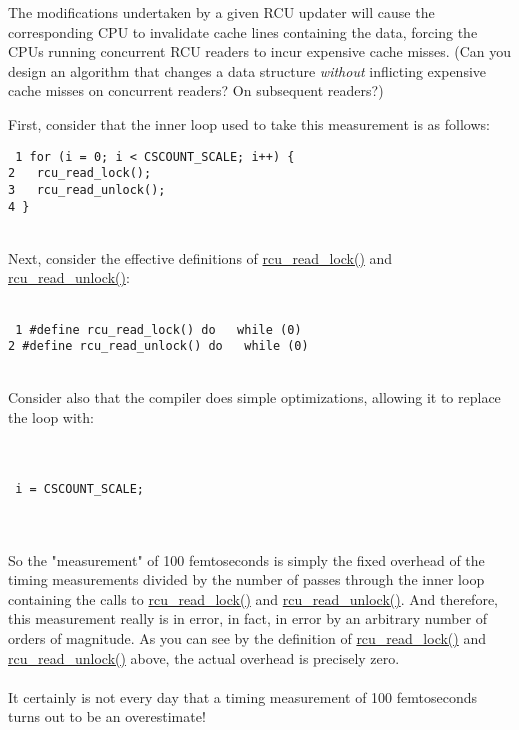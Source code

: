 The modifications undertaken by a given RCU updater will cause the
corresponding CPU to invalidate cache lines containing the data,
forcing the CPUs running concurrent RCU readers to incur expensive
cache misses.
(Can you design an algorithm that changes a data structure \emph{without}
inflicting expensive cache misses on concurrent readers?
On subsequent readers?)


First, consider that the inner loop used to
take this measurement is as follows:
\\
\vspace{5pt}
\begin{minipage}[t]{\columnwidth}
{\tt
  1 for (i = 0; i < CSCOUNT\_SCALE; i++) \{\\
  2 ~~rcu\_read\_lock();\\
  3 ~~rcu\_read\_unlock();\\
  4 \}
}
\end{minipage}
\vspace{5pt}
\\
Next, consider the effective definitions of \url{rcu_read_lock()}
and \url{rcu_read_unlock()}:
\\
\vspace{5pt}
\begin{minipage}[t]{\columnwidth}
~\\
{\tt
  1 \#define rcu\_read\_lock()   do { } while (0)\\
  2 \#define rcu\_read\_unlock() do { } while (0)
}
\end{minipage}
\vspace{5pt}
\\
Consider also that the compiler does simple optimizations,
allowing it to replace the loop with:
\\ ~ \\
\begin{minipage}[t]{\columnwidth}
~\\
{\tt
i = CSCOUNT\_SCALE;
}
\end{minipage}
\vspace{5pt}
\\ ~ \\
So the "measurement" of 100 femtoseconds is simply the fixed
overhead of the timing measurements divided by the number of
passes through the inner loop containing the calls
to \url{rcu_read_lock()} and \url{rcu_read_unlock()}.
And therefore, this measurement really is in error, in fact,
in error by an arbitrary number of orders of magnitude.
As you can see by the definition of \url{rcu_read_lock()}
and \url{rcu_read_unlock()} above, the actual overhead
is precisely zero.
\\ ~ \\
It certainly is not every day that a timing measurement of
100 femtoseconds turns out to be an overestimate!

